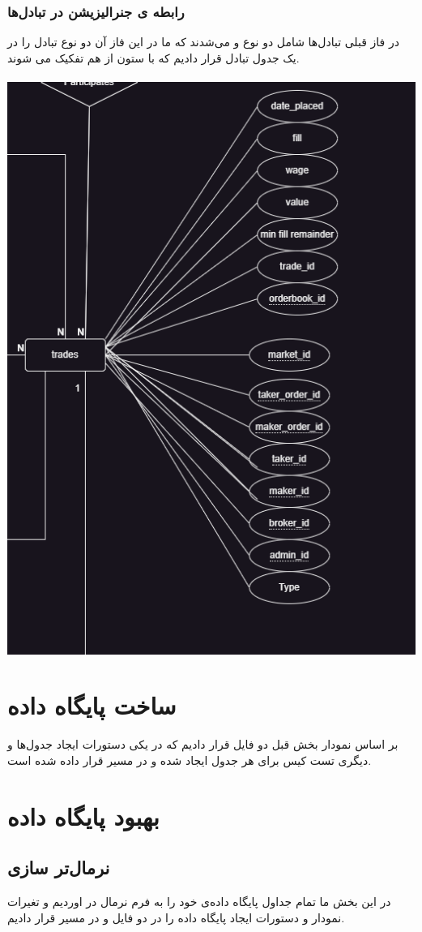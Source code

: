 \documentclass{book}
\begin{document}
\subsection{رابطه ‌ی جنرالیزیشن در تبادل‌ها}
در فاز قبلی تبادل‌ها شامل دو نوع  و  می‌شدند که ما در این فاز آن دو نوع تبادل را در یک جدول تبادل قرار دادیم که با ستون  از هم تفکیک می شوند.
\\ \\
\includegraphics[width=0.8\linewidth]{trades.png}
\newpage

\chapter{ساخت پایگاه داده}
بر اساس نمودار بخش قبل دو فایل  قرار دادیم که در یکی دستورات ایجاد جدول‌ها و دیگری تست کیس برای هر جدول ایجاد شده و در مسیر  قرار داده شده است.

\chapter{بهبود پایگاه داده}
\section{نرمال‌تر سازی}
در این بخش ما تمام جداول پایگاه داده‌ی خود را به فرم نرمال در اوردیم و تغیرات نمودار و دستورات ایجاد پایگاه داده را در دو فایل  و  در مسیر  قرار دادیم.
\end{document}
